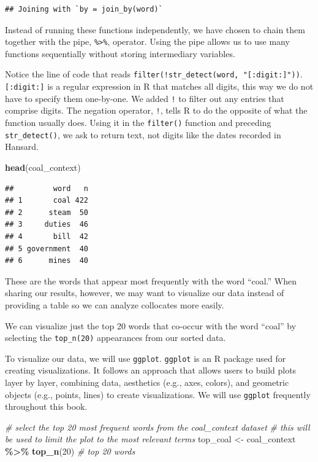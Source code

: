 \documentclass[
]{article}
\newenvironment{Shaded}{\begin{snugshade}}{\end{snugshade}}
\newcommand{\CommentTok}[1]{\textcolor[rgb]{0.56,0.35,0.01}{\textit{#1}}}
\newcommand{\DecValTok}[1]{\textcolor[rgb]{0.00,0.00,0.81}{#1}}
\newcommand{\FunctionTok}[1]{\textcolor[rgb]{0.13,0.29,0.53}{\textbf{#1}}}
\newcommand{\NormalTok}[1]{#1}
\newcommand{\OtherTok}[1]{\textcolor[rgb]{0.56,0.35,0.01}{#1}}
\newcommand{\SpecialCharTok}[1]{\textcolor[rgb]{0.81,0.36,0.00}{\textbf{#1}}}
\begin{document}
\begin{verbatim}
## Joining with `by = join_by(word)`
\end{verbatim}

Instead of running these functions independently, we have chosen to
chain them together with the pipe, \texttt{\%\textgreater{}\%},
operator. Using the pipe allows us to use many functions sequentially
without storing intermediary variables.

Notice the line of code that reads
\texttt{filter(!str\_detect(word,\ "{[}:digit:{]}"))}.
\texttt{{[}:digit:{]}} is a regular expression in R that matches all
digits, this way we do not have to specify them one-by-one. We added
\texttt{!} to filter out any entries that comprise digits. The negation
operator, \texttt{!}, tells R to do the opposite of what the function
usually does. Using it in the \texttt{filter()} function and preceding
\texttt{str\_detect()}, we ask to return text, not digits like the dates
recorded in Hansard.

\begin{Shaded}
\begin{Highlighting}[]
\FunctionTok{head}\NormalTok{(coal\_context)}
\end{Highlighting}
\end{Shaded}

\begin{verbatim}
##         word   n
## 1       coal 422
## 2      steam  50
## 3     duties  46
## 4       bill  42
## 5 government  40
## 6      mines  40
\end{verbatim}

These are the words that appear most frequently with the word ``coal.''
When sharing our results, however, we may want to visualize our data
instead of providing a table so we can analyze collocates more easily.

We can visualize just the top 20 words that co-occur with the word
``coal'' by selecting the \texttt{top\_n(20)} appearances from our
sorted data.

To visualize our data, we will use \texttt{ggplot}. \texttt{ggplot} is
an R package used for creating visualizations. It follows an approach
that allows users to build plots layer by layer, combining data,
aesthetics (e.g., axes, colors), and geometric objects (e.g., points,
lines) to create visualizations. We will use \texttt{ggplot} frequently
throughout this book.

\begin{Shaded}
\begin{Highlighting}[]
\CommentTok{\# select the top 20 most frequent words from the \textquotesingle{}coal\_context\textquotesingle{} dataset}
\CommentTok{\# this will be used to limit the plot to the most relevant terms}
\NormalTok{top\_coal }\OtherTok{\textless{}{-}}\NormalTok{ coal\_context }\SpecialCharTok{\%\textgreater{}\%}
  \FunctionTok{top\_n}\NormalTok{(}\DecValTok{20}\NormalTok{)  }\CommentTok{\# top 20 words}
\end{Highlighting}
\end{Shaded}
\end{document}
